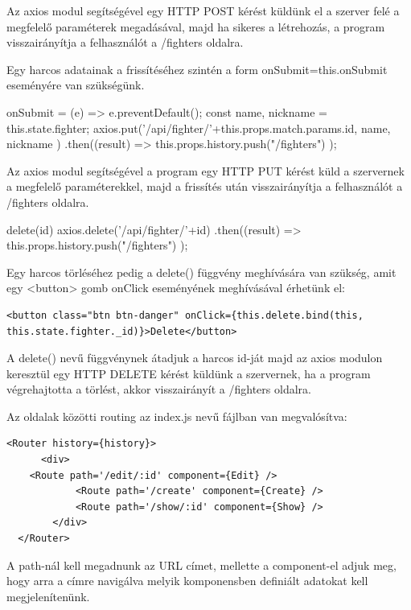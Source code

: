 Az axios modul segítségével egy HTTP POST kérést küldünk el a szerver felé a megfelelő paraméterek megadásával, majd ha sikeres a létrehozás, a program visszairányítja a felhasználót a /fighters oldalra.

Egy harcos adatainak a frissítéséhez szintén a form onSubmit={this.onSubmit} eseményére van szükségünk.

\begin{cpp}
onSubmit = (e) => {
    e.preventDefault();
    const { name, nickname } = this.state.fighter;
    axios.put('/api/fighter/'+this.props.match.params.id, { name, nickname })
      .then((result) => {
        this.props.history.push("/fighters")
      });}
\end{cpp}

Az axios modul segítségével a program egy HTTP PUT kérést küld a szervernek a megfelelő paraméterekkel, majd a frissítés után visszairányítja a felhasználót a /fighters oldalra.

\begin{cpp}
delete(id){
    axios.delete('/api/fighter/'+id)
      .then((result) => {
        this.props.history.push("/fighters")
      });}
\end{cpp}

Egy harcos törléséhez pedig a delete() függvény meghívására van szükség, amit egy <button> gomb onClick eseményének meghívásával érhetünk el:

\begin{verbatim}
<button class="btn btn-danger" onClick={this.delete.bind(this, this.state.fighter._id)}>Delete</button>
\end{verbatim}

A delete() nevű függvénynek átadjuk a harcos id-ját majd az axios modulon keresztül egy HTTP DELETE kérést küldünk a szervernek, ha a program végrehajtotta a törlést, akkor visszairányít a /fighters oldalra.


Az oldalak közötti routing az index.js nevű fájlban van megvalósítva:

\begin{verbatim}
<Router history={history}>
      <div>
	<Route path='/edit/:id' component={Edit} />
        	<Route path='/create' component={Create} />
        	<Route path='/show/:id' component={Show} />
        </div>
  </Router>
\end{verbatim}

A path-nál kell megadnunk az URL címet, mellette a component-el adjuk meg, hogy arra a címre navigálva melyik komponensben definiált adatokat kell megjelenítenünk.

